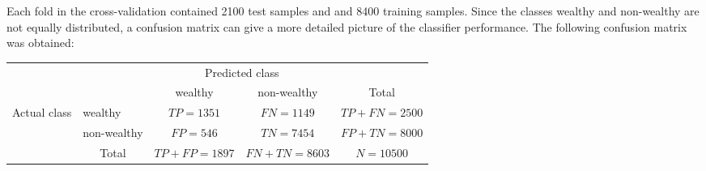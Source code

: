 Each fold in the cross-validation contained 2100 test samples and and 8400 training samples. Since the classes wealthy and non-wealthy are not equally distributed, a confusion matrix can give a more detailed picture of the classifier performance. The following confusion matrix was obtained:

\begin{table}
\centering
\begin{tabular}{l|l|c|c|c}
\multicolumn{2}{c}{}&\multicolumn{2}{c}{Predicted class}&\\
\cline{3-4}
\multicolumn{2}{c|}{}&wealthy & non-wealthy &\multicolumn{1}{c}{Total}\\
\cline{2-4}
\multirow{2}{*}{Actual class}& wealthy & $TP = 1351$ & $FN = 1149$ & $TP+FN = 2500$\\
\cline{2-4}
& non-wealthy & $FP = 546$ & $TN = 7454$ & $FP+TN = 8000$\\
\cline{2-4}
\multicolumn{1}{c}{} & \multicolumn{1}{c}{Total} & \multicolumn{1}{c}{$TP+FP=1897$} & \multicolumn{1}{c}{$FN+TN = 8603$} & \multicolumn{1}{c}{$N = 10500$}\\
\end{tabular}
\end{table}